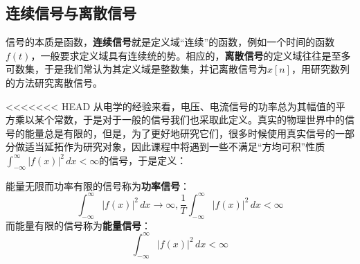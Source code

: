\subsection{连续信号与离散信号}\label{sub:signal}
信号的本质是函数，\textbf{连续信号}就是定义域“连续”的函数，例如一个时间的函数$f(t)$，一般要求定义域具有连续统的势。相应的，\textbf{离散信号}的定义域往往是至多可数集，于是我们常认为其定义域是整数集，并记离散信号为$x[n]$，用研究数列的方法研究离散信号。

<<<<<<< HEAD
从电学的经验来看，电压、电流信号的功率总为其幅值的平方乘以某个常数，于是对于一般的信号我们也采取此定义。真实的物理世界中的信号的能量总是有限的，但是，为了更好地研究它们，很多时候使用真实信号的一部分做适当延拓作为研究对象，因此课程中将遇到一些不满足“方均可积”性质$\int_{-\infty}^{\infty}| f(x)| ^2\,dx<\infty$的信号，于是定义：
\begin{definition}[功率信号与能量信号]
能量无限而功率有限的信号称为\textbf{功率信号}：\[\int_{-\infty}^{\infty}| f(x)| ^2\,dx\to\infty,\frac{1}{T}\int_{-\infty}^{\infty}| f(x)|^2  \,dx<\infty\]
而能量有限的信号称为\textbf{能量信号}：\[\int_{-\infty}^{\infty}| f(x)| ^2\,dx<\infty\]
\end{definition}

